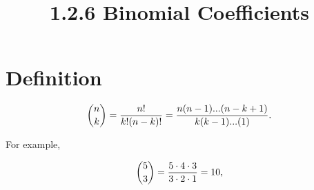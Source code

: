 \documentclass{article}
\title{1.2.6 Binomial Coefficients}
\begin{document}
\maketitle
\section*{Definition}
\[
  \dbinom{n}{k} = \dfrac{n!}{k!(n-k)!} = \dfrac{n(n-1)...(n-k+1)}{k(k-1)...(1)}.
\]

For example,

\[
  \dbinom{5}{3} = \dfrac{5 \cdot 4 \cdot 3}{3 \cdot 2 \cdot 1} = 10,
\]
\end{document}

